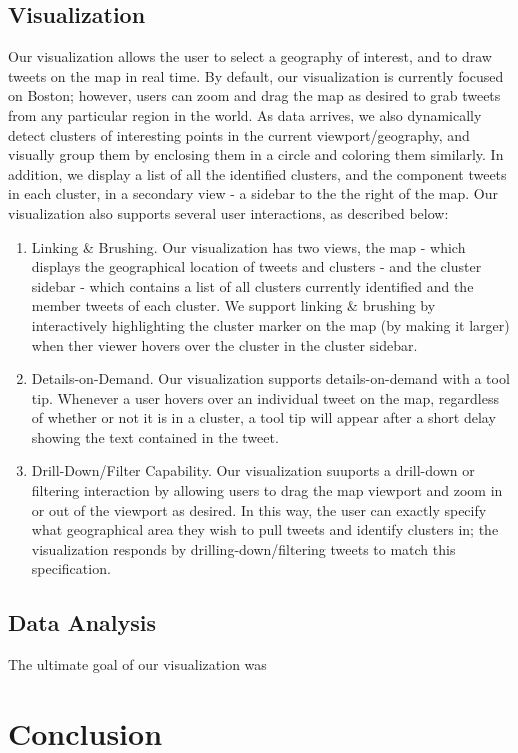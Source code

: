 \documentclass[pdftex,12pt,a4paper]{article}
\begin{document}
\subsection{Visualization}
Our visualization allows the user to select a geography of interest, and to draw tweets on the map in real time. By default, our visualization is currently focused on Boston; however, users can zoom and drag the map as desired to grab tweets from any particular region in the world. As data arrives, we also dynamically detect clusters of interesting points in the current viewport/geography, and visually group them by enclosing them in a circle and coloring them similarly. In addition, we display a list of all the identified clusters, and the component tweets in each cluster, in a secondary view - a sidebar to the the right of the map. Our visualization also supports several user interactions, as described below:
\begin{enumerate}
\item Linking \& Brushing. Our visualization has two views, the map - which displays the geographical location of tweets and clusters - and the cluster sidebar - which contains a list of all clusters currently identified and the member tweets of each cluster. We support linking \& brushing by interactively highlighting the cluster marker on the map (by making it larger) when ther viewer hovers over the cluster in the cluster sidebar. 
\item Details-on-Demand. Our visualization supports details-on-demand with a tool tip. Whenever a user hovers over an individual tweet on the map, regardless of whether or not it is in a cluster, a tool tip will appear after a short delay showing the text contained in the tweet. 
\item Drill-Down/Filter Capability. Our visualization suuports a drill-down or filtering interaction by allowing users to drag the map viewport and zoom in or out of the viewport as desired. In this way, the user can exactly specify what geographical area they wish to pull tweets and identify clusters in; the visualization responds by drilling-down/filtering tweets to match this specification.
\end{enumerate}

\subsection{Data Analysis}
The ultimate goal of our visualization was
\section{Conclusion}
\end{document}
